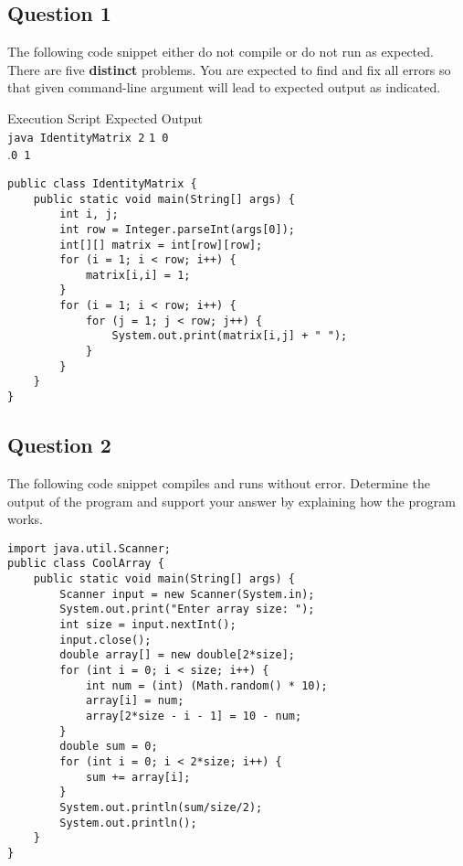 \documentclass[12pt,letterpaper,twoside]{article}
\begin{document}


\subsection*{Question 1}

The following code snippet either do not compile or do not run as expected. There are five \textbf{distinct} problems. You are expected to find and fix all errors so that given command-line argument will lead to expected output as indicated.

Execution Script \hfill Expected Output\\
\texttt{java IdentityMatrix 2} \hfill \texttt{1 0}\\
.\hfill \texttt{0 1}

\begin{lstlisting}
public class IdentityMatrix {
	public static void main(String[] args) {
		int i, j;
		int row = Integer.parseInt(args[0]);
		int[][] matrix = int[row][row];
		for (i = 1; i < row; i++) {
			matrix[i,i] = 1;
		}
		for (i = 1; i < row; i++) {
			for (j = 1; j < row; j++) {
				System.out.print(matrix[i,j] + " ");
			}
		}
	}
}
\end{lstlisting}

\newpage

\subsection*{Question 2}

The following code snippet compiles and runs without error. Determine the output of the program and support your answer by explaining how the program works.
\begin{lstlisting}
import java.util.Scanner;
public class CoolArray {
	public static void main(String[] args) {
		Scanner input = new Scanner(System.in);
		System.out.print("Enter array size: ");
		int size = input.nextInt();
		input.close();
		double array[] = new double[2*size];
		for (int i = 0; i < size; i++) {
			int num = (int) (Math.random() * 10);
			array[i] = num;
			array[2*size - i - 1] = 10 - num;
		}
		double sum = 0;
		for (int i = 0; i < 2*size; i++) {
			sum += array[i];
		}
		System.out.println(sum/size/2);
		System.out.println();
	}
}
\end{lstlisting}

\newpage
\end{document}

